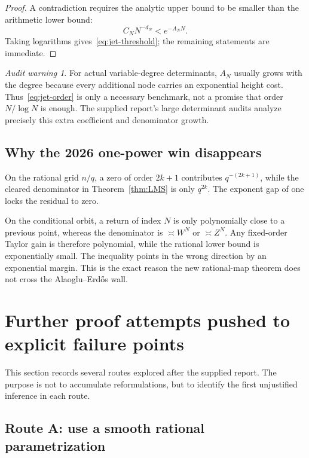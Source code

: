 \documentclass[11pt]{article}
\theoremstyle{definition}
\theoremstyle{remark}
\newtheorem{warning}[theorem]{Audit warning}
\begin{document}
\begin{proof}
A contradiction requires the analytic upper bound to be smaller than the arithmetic lower
bound:
\[
 C_NN^{-d_N}<e^{-A_NN}.
\]
Taking logarithms gives~\eqref{eq:jet-threshold}; the remaining statements are immediate.
\end{proof}

\begin{warning}
For actual variable-degree determinants, $A_N$ usually grows with the degree because every
additional node carries an exponential height cost.  Thus~\eqref{eq:jet-order} is only a
necessary benchmark, not a promise that order $N/\log N$ is enough.  The supplied report's
large determinant audits analyze precisely this extra coefficient and denominator growth.
\end{warning}

\subsection{Why the 2026 one-power win disappears}

On the rational grid $n/q$, a zero of order $2k+1$ contributes $q^{-(2k+1)}$, while the
cleared denominator in Theorem~\ref{thm:LMS} is only $q^{2k}$.  The exponent gap of one locks
the residual to zero.

On the conditional orbit, a return of index $N$ is only polynomially close to a previous
point, whereas the denominator is $\asymp W^N$ or $\asymp Z^N$.  Any fixed-order Taylor gain
is therefore polynomial, while the rational lower bound is exponentially small.  The
inequality points in the wrong direction by an exponential margin.  This is the exact reason
the new rational-map theorem does not cross the Alaoglu--Erd\H{o}s wall.

\section{Further proof attempts pushed to explicit failure points}
\label{sec:attempts}

This section records several routes explored after the supplied report.  The purpose is not
to accumulate reformulations, but to identify the first unjustified inference in each route.

\subsection{Route A: use a smooth rational parametrization}
\end{document}
